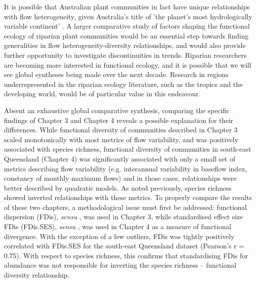 {{It is possible that Australian plant communities in fact have unique relationships with flow heterogeneity, given Australia's title of 'the planet’s most hydrologically variable continent' \citep{Peel2004, Rustomji2009}. A larger comparative study of factors shaping the functional ecology of riparian plant communities would be an essential step towards finding generalities in flow heterogeneity-diversity relationships, and would also provide further opportunity to investigate discontinuities in trends. Riparian researchers are becoming more interested in functional ecology, and it is possible that we will see global syntheses being made over the next decade. Research in regions underrepresented in the riparian ecology literature, such as the tropics and the developing world, would be of particular value in this endeavour.

Absent an exhaustive global comparative synthesis, comparing the specific findings of Chapter 3 and Chapter 4 reveals a possible explanation for their differences. While functional diversity of communities described in Chapter 3 scaled monotonically with most metrics of flow variability, and was positively associated with species richness, functional diversity of communities in south-east Queensland (Chapter 4) was significantly associated with only a small set of metrics describing flow variability (e.g. interannual variability in baseflow index, constancy of monthly maximum flows) and in those cases, relationships were better described by quadratic models. As noted previously, species richness showed inverted relationships with these metrics. To properly compare the results of these two chapters, a methodological issue must first be addressed: functional dispersion (FDis), \textit{sensu} \citet{Laliberte2010}, was used in Chapter 3, while standardised effect size FDis (FDis.SES), \textit{sensu} \citet{Mason2013}, was used in Chapter 4 as a measure of functional divergence. With the exception of a few outliers, FDis was tightly positively correlated with FDis.SES for the south-east Queensland dataset (Pearson's r = 0.75). With respect to species richness, this confirms that standardising FDis for abundance was not responsible for inverting the species richness – functional diversity relationship.

}}
